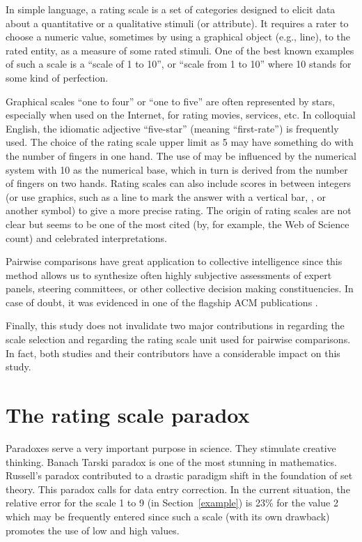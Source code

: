 \documentclass [12pt]{article}
\begin{document}
In simple language, a rating scale is a set of categories designed to elicit data about a quantitative or a qualitative stimuli (or attribute). It requires a rater to choose a numeric value, sometimes by using a graphical object (e.g., line), to the rated entity, as a measure of some rated stimuli.
One of the best known examples of such a scale is a ``scale of 1 to 10'', or ``scale from 1 to 10'' where 10 stands for some kind of perfection.


Graphical scales ``one to four'' or ``one to five'' are often represented by stars, especially when used on the Internet, for rating movies, services, etc. In colloquial English, the idiomatic adjective ``five-star'' (meaning ``first-rate'') is frequently used. The choice of the rating scale upper limit as 5 may have something do with the number of fingers in one hand. The use of  may be influenced by the numerical system with 10 as the numerical base, which in turn is derived from the number of fingers on two hands. Rating scales can also include scores in between integers (or use graphics, such as a line to mark the answer with a vertical bar, , or another symbol) to give a more precise rating. The origin of rating scales are not clear but \cite{DA1978} seems to be one of the most cited (by, for example, the Web of Science count) and celebrated interpretations.

Pairwise comparisons have great application to collective intelligence since this method allows us to synthesize often highly subjective assessments of expert panels, steering committees, or other collective decision making constituencies. 
In case of doubt, it was evidenced in one of the flagship ACM publications \cite{FHH2010}.
 
Finally, this study does not invalidate two major contributions in \cite{DXLD2008} regarding the scale selection and \cite{CW2010} regarding the rating scale unit used for pairwise comparisons. In fact, both studies and their contributors have a considerable impact on this study. 
\section{The rating scale paradox}

Paradoxes serve a very important purpose in science. They stimulate creative thinking. Banach Tarski paradox is one of the most stunning in mathematics. Russell's paradox contributed to a drastic paradigm shift in the foundation of set theory. This paradox calls for data entry correction. In the current situation, the relative error for the scale 1 to 9 (in Section~\ref{example}) is 23\% for the value 2 which may be frequently entered since such a scale (with its own drawback) promotes the use of low and high values.\\
\end{document}
